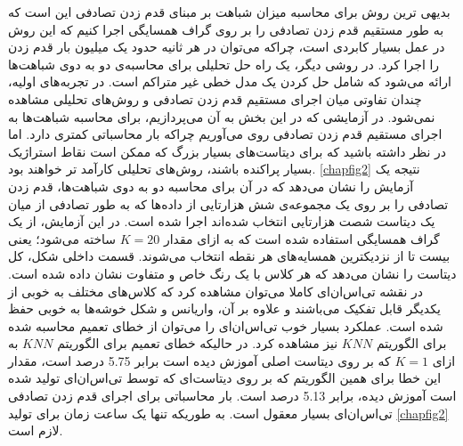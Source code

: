بدیهی ترین روش برای محاسبه میزان شباهت بر مبنای قدم زدن تصادفی این است که به طور مستقیم قدم زدن تصادفی را بر روی گراف همسایگی اجرا کنیم که این روش در عمل بسیار کابردی است، چراکه می‌توان در هر ثانیه حدود یک میلیون بار قدم زدن را اجرا کرد. در روشی دیگر، یک راه حل تحلیلی برای محاسبه‌ی دو به دوی شباهت‌ها ارائه می‌شود که شامل حل کردن یک مدل خطی غیر متراکم است.  در تجربه‌های اولیه، چندان تفاوتی میان اجرای مستقیم قدم زدن تصادفی و روش‌های تحلیلی مشاهده نمی‌‌شود. در آزمایشی که در این بخش به آن می‌پردازیم، برای محاسبه شباهت‌ها به اجرای مستقیم قدم زدن تصادفی روی می‌آوریم چراکه بار محاسباتی کمتری دارد. اما در نظر داشته باشید که برای دیتاست‌های بسیار بزرگ که ممکن است نقاط استراژیک بسیار پراکنده باشند، روش‌های تحلیلی کارآمد تر خواهند بود. \cref{chapfig2} نتیجه یک آزمایش را نشان می‌دهد که در آن برای محاسبه دو به دوی شباهت‌ها، قدم زدن تصادفی را بر روی یک مجموعه‌ی شش هزارتایی از داده‌ها که به طور تصادفی از میان یک دیتاست شصت هزارتایی انتخاب شده‌اند اجرا شده است. در این آزمایش، از یک گراف همسایگی استفاده شده است که به ازای مقدار $K=20$ ساخته می‌شود؛ یعنی بیست تا از نزدیکترین همسایه‌های هر نقطه انتخاب می‌شوند. قسمت داخلی شکل، کل دیتاست را نشان می‌دهد که هر کلاس با یک رنگ خاص و متفاوت نشان داده شده است. در نقشه تی‌اس‌ان‌ای کاملا می‌توان مشاهده کرد که کلاس‌های مختلف به خوبی از یکدیگر قابل تفکیک می‌باشند و علاوه بر آن، واریانس و شکل خوشه‌ها به خوبی حفظ شده است. عملکرد بسیار خوب   تی‌اس‌ان‌ای را می‌توان از خطای تعمیم   محاسبه شده برای الگوریتم $KNN$ نیز مشاهده کرد. در حالیکه خطای تعمیم برای الگوریتم $KNN$ به ازای $K=1$ که بر روی دیتاست اصلی آموزش دیده است برابر 5.75 درصد است، مقدار این خطا برای همین الگوریتم که بر روی دیتاست‌ای که توسط تی‌اس‌ان‌ای تولید شده است آموزش دیده، برابر 5.13 درصد است. بار محاسباتی برای اجرای قدم زدن تصادفی تی‌اس‌ان‌ای بسیار معقول است. به طوریکه تنها یک ساعت زمان برای تولید \cref{chapfig2} لازم است.

